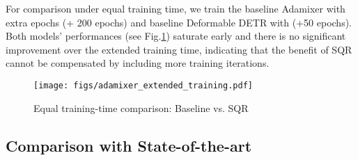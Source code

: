 \documentclass[10pt,twocolumn,letterpaper]{article}
\begin{document}
For comparison under equal training time, we train the baseline Adamixer with extra epochs (+ 200 epochs) and baseline Deformable DETR with (+50 epochs). Both models' performances (see Fig.\ref{fig:training_time}) saturate early and there is no significant improvement over the extended training time, indicating that the benefit of SQR cannot be compensated by including more training iterations.

\begin{figure}[]
    \texttt{[image: figs/adamixer\_extended\_training.pdf]}
    \caption{Equal training-time comparison: Baseline vs. SQR}
    \label{fig:training_time}
\end{figure}


\subsection{Comparison with State-of-the-art}
\end{document}
